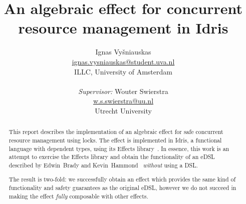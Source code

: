 \documentclass{article}
\title{An algebraic effect for concurrent resource management in Idris}
\author{Ignas Vyšniauskas \\ \url{ignas.vysniauskas@student.uva.nl} \\
        ILLC, University of Amsterdam \\
    \\ \textit{Supervisor:} Wouter Swierstra
    \\ \url{w.s.swierstra@uu.nl}
    \\ Utrecht University
}
\begin{document}
\maketitle

\begin{abstract}
    This report describes the implementation of an algebraic effect for safe
    concurrent resource management using locks. The effect is implemented in
    Idris, a functional language with dependent types, using its Effects
    library~\cite{effects-idr}. In essence, this work is an attempt to exercise
    the Effects library and obtain the functionality of an eDSL described by
    Edwin~Brady and Kevin~Hammond~\cite{cbconc-fi} \emph{without} using a DSL.

    The result is two-fold: we successfully obtain an effect which provides the
    same kind of functionality and safety guarantees as the original eDSL,
    however we do not succeed in making the effect \emph{fully} composable with
    other effects.
\end{abstract}









\end{document}
